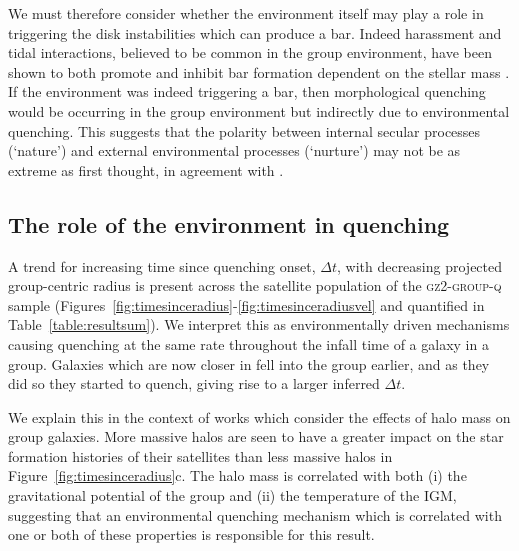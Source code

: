 \documentclass[useAMS,usenatbib]{mn2e}
\begin{document}
We must therefore consider whether the environment itself may play a role in triggering the disk instabilities which can produce a bar. Indeed harassment and tidal interactions, believed to be common in the group environment, have been shown to both promote and inhibit bar formation dependent on the stellar mass \citep{noguchi88, moore96, skibba12}.  If the environment was indeed triggering a bar, then morphological quenching would be occurring in the group environment but indirectly due to environmental quenching. This suggests that the polarity between internal secular processes (`nature') and external environmental processes (`nurture') may not be as extreme as first thought, in agreement with \cite{skibba12}. 

\subsection{The role of the environment in quenching}\label{sec:roleenv}

A trend for increasing time since quenching onset, $\Delta t$, with decreasing projected group-centric radius is present across the satellite population of the \textsc{gz2-group-q} sample (Figures~\ref{fig:timesinceradius}-\ref{fig:timesinceradiusvel} and quantified in Table~\ref{table:resultsum}). We interpret this as environmentally driven mechanisms causing quenching at the same rate throughout the infall time of a galaxy in a group. Galaxies which are now closer in fell into the group earlier, and as they did so they started to quench, giving rise to a larger inferred $\Delta t$.

We explain this in the context of works which consider the effects of halo mass on group galaxies. More massive halos are seen to have a greater impact on the star formation histories of their satellites than less massive halos in Figure~\ref{fig:timesinceradius}c. The halo mass is correlated with both (i) the gravitational potential of the group and (ii) the temperature of the IGM, suggesting that an environmental quenching mechanism which is correlated with one or both of these properties is responsible for this result.
\end{document}
